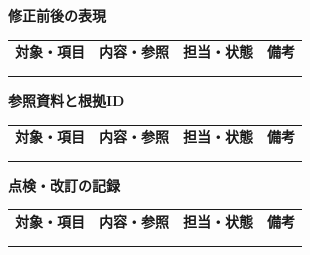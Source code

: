 \documentclass[11pt,a4paper]{article}
\begin{document}
\par{}\noindent\textbf{修正前後の表現}\par\vspace{1mm}
{\fontsize{8.5}{13}\selectfont
\begin{tabularx}{\linewidth}{@{}XXXX@{}}
\textbf{対象・項目} & \textbf{内容・参照} & \textbf{担当・状態} & \textbf{備考}\\[2mm]
\strut & \strut & \strut & \strut\\[5mm]
\strut & \strut & \strut & \strut\\[5mm]
\end{tabularx}
}\vspace{2mm}\par
{}
\par{}\noindent\textbf{参照資料と根拠ID}\par\vspace{1mm}
{\fontsize{8.5}{13}\selectfont
\begin{tabularx}{\linewidth}{@{}XXXX@{}}
\textbf{対象・項目} & \textbf{内容・参照} & \textbf{担当・状態} & \textbf{備考}\\[2mm]
\strut & \strut & \strut & \strut\\[5mm]
\strut & \strut & \strut & \strut\\[5mm]
\end{tabularx}
}\vspace{2mm}\par
{}
\par{}\noindent\textbf{点検・改訂の記録}\par\vspace{1mm}
{\fontsize{8.5}{13}\selectfont
\begin{tabularx}{\linewidth}{@{}XXXX@{}}
\textbf{対象・項目} & \textbf{内容・参照} & \textbf{担当・状態} & \textbf{備考}\\[2mm]
\strut & \strut & \strut & \strut\\[5mm]
\strut & \strut & \strut & \strut\\[5mm]
\end{tabularx}
}\vspace{2mm}\par
\end{document}
